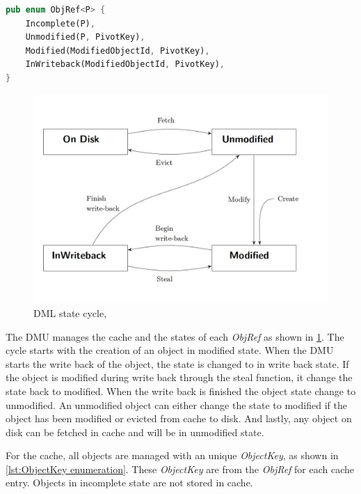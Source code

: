 \documentclass[
	12pt,
	a4paper,
	abstract,
	bibliography=totoc,
	chapterprefix,
	headings=openright,
	numbers=endperiod,
	parskip=half,
	twoside,
]{scrreprt}
\begin{document}
\newpage

\begin{lstlisting}[language=Rust,mathescape=true,caption={ObjRef enumeration, parameter P equals \&ObjectPointer<D>},
	label=lst:ObjRef enumeration]
pub enum ObjRef<P> {
    Incomplete(P),
    Unmodified(P, PivotKey),
    Modified(ModifiedObjectId, PivotKey),
    InWriteback(ModifiedObjectId, PivotKey),
}
\end{lstlisting}

\begin{figure}[ht]
	\centering
	\includegraphics[scale=0.4]{DML_state_cycle.jpg}
	\caption{DML state cycle, \cite{wiedemann2018modern}}
		\label{fig:DML state cycle}
\end{figure}

The DMU manages the cache and the states of each \emph{ObjRef} as shown in \ref{fig:DML state cycle}.
The cycle starts with the creation of an object in modified state. When the DMU starts the write back of the object, the state
is changed to in write back state.
If the object is modified during write back through the steal function, it change the state back to modified.
When the write back is finished the object state change to unmodified.
An unmodified object can either change the state to modified if the object has been modified or evicted from cache to disk.
And lastly, any object on disk can be fetched in cache and will be in unmodified state.

For the cache, all objects are managed with an unique \emph{ObjectKey}, as shown in \ref{lst:ObjectKey enumeration}.
These \emph{ObjectKey} are  from the \emph{ObjRef} for each cache entry.
Objects in incomplete state are not stored in cache.
\end{document}
